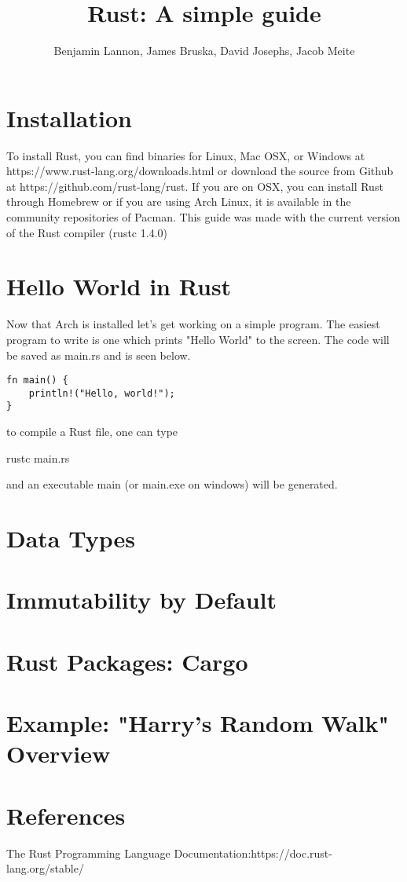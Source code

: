 \documentclass{article}
\title{Rust: A simple guide}
\author{Benjamin Lannon, James Bruska, David Josephs, Jacob Meite}
\begin{document}
\maketitle
\tableofcontents

\section{Installation}
To install Rust, you can find binaries for Linux, Mac OSX, or Windows at https://www.rust-lang.org/downloads.html or download the source from Github at https://github.com/rust-lang/rust. If you are on OSX, you can install Rust through Homebrew or if you are using Arch Linux, it is available in the community repositories of Pacman. This guide was made with the current version of the Rust compiler (rustc 1.4.0)

\section{Hello World in Rust}
Now that Arch is installed let's get working on a simple program. The easiest program to write is one which prints "Hello World" to the screen. The code will be saved as main.rs and is seen below.
\begin{lstlisting}
fn main() {
	println!("Hello, world!");
}
\end{lstlisting}

to compile a Rust file, one can type \begin{small}
rustc main.rs
\end{small}
and an executable main (or main.exe on windows) will be generated.

\section{Data Types}

\section{Immutability by Default}

\section{Rust Packages: Cargo}

\section{Example: "Harry's Random Walk" Overview}

\section{References}
The Rust Programming Language Documentation:https://doc.rust-lang.org/stable/
\end{document}
